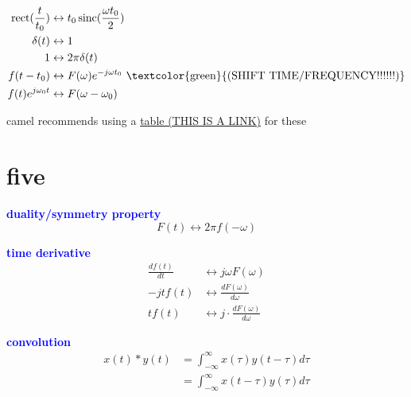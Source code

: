 \documentclass[a5paper, fleqn]{article}
\newcommand{\vocab}[1]{\textbf{\textcolor{blue}{#1}}}
\newcommand{\note}[1]{\textcolor{green}{#1}}
\DeclareMathOperator{\sinc}{sinc}
\DeclareMathOperator{\rect}{rect}
\begin{document}
\begin{align*}
  \rect(\frac{t}{t_0})  & \leftrightarrow t_0 \sinc(\frac{\omega t_0}{2})                                         \\
  \delta(t)             & \leftrightarrow 1                                                                       \\
  1                     & \leftrightarrow 2 \pi \delta(t)                                                         \\
  f(t - t_0)            & \leftrightarrow F(\omega) e^{-j\omega t_0} ~ \text{\note{(SHIFT TIME/FREQUENCY!!!!!!)}} \\
  f(t) e^{j \omega_0 t} & \leftrightarrow F(\omega - \omega_0)
\end{align*}

camel recommends using a \href{https://ethz.ch/content/dam/ethz/special-interest/baug/ibk/structural-mechanics-dam/education/identmeth/fourier.pdf}{table (THIS IS A LINK)} for these

\section*{\textcolor{primary}{five}}

\vocab{duality/symmetry property}
\[F(t) \leftrightarrow 2\pi f(-\omega)\]

\vocab{time derivative}
\begin{align*}
  \frac{df(t)}{dt} & \leftrightarrow j\omega F(\omega)                  \\
  -jt f(t)         & \leftrightarrow \frac{dF(\omega)}{d\omega}         \\
  t f(t)           & \leftrightarrow j \cdot \frac{dF(\omega)}{d\omega}
\end{align*}

\vocab{convolution}
\begin{align*}
  x(t) * y(t)
   & = \int_{-\infty}^\infty x(\tau) y(t - \tau) d\tau \\
   & = \int_{-\infty}^\infty x(t - \tau) y(\tau) d\tau \\
\end{align*}
\end{document}
